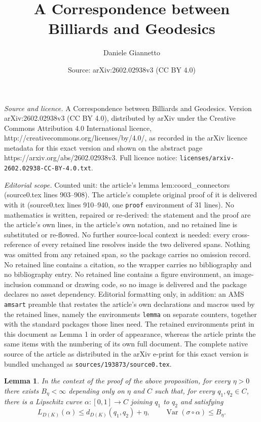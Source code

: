 \documentclass[10pt,a4paper]{amsart}
\title{A Correspondence between Billiards and Geodesics}
\author{Daniele Giannetto}
\date{Source: arXiv:2602.02938v3 (CC BY 4.0)}
\newtheorem{lemma}{Lemma}
\begin{document}
\maketitle

\noindent\emph{Source and licence.} A Correspondence between Billiards and Geodesics. Version arXiv:2602.02938v3 (CC BY 4.0), distributed by arXiv under the Creative Commons Attribution 4.0 International licence, http://creativecommons.org/licenses/by/4.0/, as recorded in the arXiv licence metadata for this exact version and shown on the abstract page https://arxiv.org/abs/2602.02938v3. Full licence notice: \texttt{licenses/arxiv-2602.02938-CC-BY-4.0.txt}.\par\smallskip

\noindent\textit{Editorial scope.} Counted unit: the article's lemma lem:coord\_connectors (source0.tex lines 903--908). The article's complete original proof of it is delivered with it (source0.tex lines 910--940, one \texttt{proof} environment of 31 lines). No mathematics is written, repaired or re-derived: the statement and the proof are the article's own lines, in the article's own notation, and no retained line is substituted or re-flowed.  No further source-local context is needed: every cross-reference of every retained line resolves inside the two delivered spans.  Nothing was omitted from any retained span, so the package carries no omission record.  No retained line contains a citation, so the wrapper carries no bibliography and no bibliography entry.  No retained line contains a figure environment, an image-inclusion command or drawing code, so no image is delivered and the package declares no asset dependency.  Editorial formatting only, in addition: an AMS \texttt{amsart} preamble that restates the article's own declarations and macros used by the retained lines, namely the environments \texttt{lemma} on separate counters, together with the standard packages those lines need.  The retained environments print in this document as Lemma 1 in order of appearance, whereas the article prints the same items with the numbering of its own full document.  The complete native source of the article as distributed in the arXiv e-print for this exact version is bundled unchanged as \texttt{sources/193873/source0.tex}.
\begin{lemma}\label{lem:coord_connectors}
In the context of the proof of the above proposition, for every $\eta>0$ there exists
$B_\eta<\infty$ depending only on $\eta$ and $C$ such that, for every $q_1,q_2\in C$, there is a Lipschitz curve $\alpha:[0,1]\to C$ joining $q_1$ to $q_2$ and satisfying
$$L_{D(K)}(\alpha)\le d_{D(K)}(q_1,q_2)+\eta,\qquad
\operatorname{Var}(\sigma\circ\alpha)\le B_\eta.$$
\end{lemma}
\end{document}
